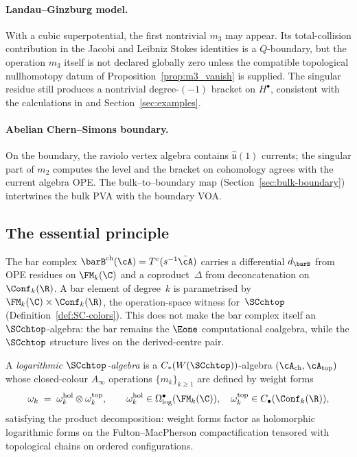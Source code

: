 \paragraph{\textbf{Landau–Ginzburg model.}}
With a cubic superpotential, the first nontrivial $m_3$ may appear.
Its total-collision contribution in the Jacobi and Leibniz Stokes
identities is a \(Q\)-boundary, but the operation \(m_3\) itself is
not declared globally zero unless the compatible topological
nullhomotopy datum of Proposition~\ref{prop:m3_vanish} is supplied.
The singular residue still produces a nontrivial degree-$(-1)$ bracket
on $H^\bullet$, consistent with the calculations in \cite{GRW21} and
Section~\ref{sec:examples}.

\paragraph{\textbf{Abelian Chern–Simons boundary.}}
On the boundary, the raviolo vertex algebra contains $\widehat{\mathfrak u}(1)$ currents; the singular part of $m_2$
computes the level and the bracket on cohomology agrees with the current algebra OPE.
The bulk–to–boundary map (Section~\ref{sec:bulk-boundary}) intertwines the bulk PVA with the boundary VOA.

\subsection{The essential principle}
\label{sec:bridge-principle}

The bar complex $\barB^{\mathrm{ch}}(\cA)=T^c(s^{-1}\bar\cA)$
carries a differential $d_{\barB}$ from OPE residues on $\FM_k(\C)$
and a coproduct~$\Delta$ from deconcatenation on $\Conf_k(\R)$. A bar
element of degree~$k$ is parametrised by
$\FM_k(\C)\times\Conf_k(\R)$, the operation-space witness
for~$\SCchtop$ (Definition~\ref{def:SC-colors}). This does not make
the bar complex itself an $\SCchtop$-algebra: the bar remains the
$\Eone$ computational coalgebra, while the $\SCchtop$ structure lives
on the derived-centre pair.

\begin{definition}
\label{def:log-SC-algebra}
A \emph{logarithmic $\SCchtop$-algebra} is a $C_\ast(W(\SCchtop))$-algebra $(\cA_{\mathrm{ch}}, \cA_{\mathrm{top}})$ whose closed-colour $A_\infty$ operations $\{m_k\}_{k \ge 1}$ are defined by weight forms
\[
 \omega_k \;=\; \omega_k^{\mathrm{hol}} \otimes \omega_k^{\mathrm{top}},
 \qquad
 \omega_k^{\mathrm{hol}} \in \Omega^\bullet_{\log}(\FM_k(\C)),
 \quad
 \omega_k^{\mathrm{top}} \in C_\bullet(\Conf_k(\R)),
\]
satisfying the product decomposition: weight forms factor as holomorphic logarithmic forms on the Fulton--MacPherson compactification tensored with topological chains on ordered configurations.
\end{definition}

